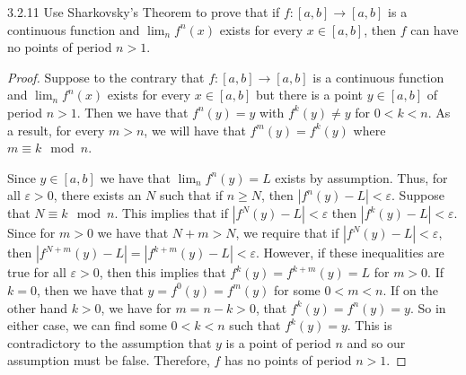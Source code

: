 \begin{problem}{3.2.11}
  Use Sharkovsky's Theorem to prove that if $f: [a, b] \to [a, b]$ is a continuous
  function and $\lim_n f^n(x)$ exists for every $x \in [a, b]$, then $f$ can have no points of
  period $n > 1$.
\end{problem}

\begin{proof}
  Suppose to the contrary that $f: [a, b] \to [a, b]$ is a continuous
  function and $\lim_n f^n(x)$ exists for every $x \in [a, b]$ but there is a
  point $y\in [a,b]$ of period $n>1$. Then we have that $f^n(y) = y$ with $f^k(y) \neq y$ for $0 < k < n$.
  As a result, for every $m > n$, we will have that $f^m(y) = f^k(y)$ where $m \equiv k \mod n$.

  Since $y\in [a,b]$ we have that $\lim_n f^n(y) = L$ exists by assumption. Thus, for all $\varepsilon >0$,
  there exists an $N$ such that if $n \geq N$, then $|f^n(y) - L | < \varepsilon$. Suppose that $N \equiv k \mod n$.
  This implies that if $|f^N(y) - L| < \varepsilon$ then $|f^k(y) - L| < \varepsilon$.
  Since for $m > 0$ we have that $N + m > N$, we require that if
  $|f^N(y) - L| < \varepsilon$, then $|f^{N+m}(y) - L| = |f^{k+m}(y) - L| < \varepsilon$.
  However, if these inequalities are true for all $\varepsilon >0$, then
  this implies that $f^k(y) = f^{k+m}(y) = L$ for $m > 0$.
  If $k=0$, then we have that $y = f^0(y) = f^m(y)$ for some $0 < m < n$.
  If on the other hand $k > 0$, we have for $m = n-k > 0$, that $f^k(y) = f^{n}(y) = y$.
  So in either case, we can find some $0 < k < n$ such that $f^k(y) = y$.
  This is contradictory to the assumption that $y$ is a point of period $n$ and so our assumption must be false.
  Therefore, $f$ has no points of period $n  > 1$.


\end{proof}
\newpage
